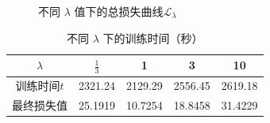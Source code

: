 \documentclass[UTF8,openany]{ctexbook}
\begin{document}
\begin{figure}[h!]
    \centering
    \caption{不同 $\lambda$ 值下的总损失曲线$\mathcal{L}_\lambda$}
    \label{fig:loss}
\end{figure}

\begin{table}[h!]
    \centering
    \caption{不同 $\lambda$ 下的训练时间（秒）}
    \begin{tabular}{ccccc}
        \toprule
        $\lambda$ & $\frac{1}{3}$ & 1 & 3 & 10 \\
        \midrule
        训练时间$t$ & 2321.24 & 2129.29  & 2556.45 & 2619.18 \\
        最终损失值 & 25.1919 & 10.7254 & 18.8458 & 31.4229 \\
        \bottomrule
    \end{tabular}
    \label{tab:lambda_time_transposed}
\end{table}
\end{document}
